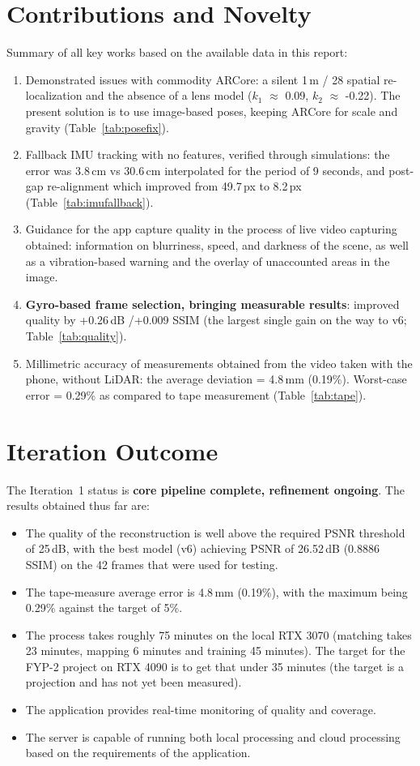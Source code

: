 \section{Contributions and Novelty}
\label{sec:novelty}
Summary of all key works based on the available data in this report:
\begin{enumerate}
    \item Demonstrated issues with commodity ARCore: a silent 1\,m / 28\textdegree{} spatial re-localization and the absence of a lens model ($k_1$ $\approx$ 0.09, $k_2$ $\approx$ -0.22). The present solution is to use image-based poses, keeping ARCore for scale and gravity (Table~\ref{tab:posefix}).
    \item Fallback IMU tracking with no features, verified through simulations: the error was 3.8\,cm vs 30.6\,cm interpolated for the period of 9 seconds, and post-gap re-alignment which improved from 49.7\,px to 8.2\,px (Table~\ref{tab:imufallback}).
    \item Guidance for the app capture quality in the process of live video capturing obtained: information on blurriness, speed, and darkness of the scene, as well as a vibration-based warning and the overlay of unaccounted areas in the image.
    \item \textbf{Gyro-based frame selection, bringing measurable results}: improved quality by +0.26\,dB /+0.009 SSIM (the largest single gain on the way to v6; Table~\ref{tab:quality}).
    \item Millimetric accuracy of measurements obtained from the video taken with the phone, without LiDAR: the average deviation = 4.8\,mm (0.19\%). Worst-case error = 0.29\% as compared to tape measurement (Table~\ref{tab:tape}).
\end{enumerate}

\section{Iteration Outcome}
The Iteration~1 status is \textbf{core pipeline complete, refinement ongoing}. The results obtained thus far are:
\begin{itemize}
    \item The quality of the reconstruction is well above the required PSNR threshold of 25\,dB, with the best model (v6) achieving PSNR of 26.52\,dB (0.8886 SSIM) on the 42 frames that were used for testing.
    \item The tape-measure average error is 4.8\,mm (0.19\%), with the maximum being 0.29\% against the target of 5\%.
    \item The process takes roughly 75 minutes on the local RTX 3070 (matching takes 23 minutes, mapping 6 minutes and training 45 minutes). The target for the FYP-2 project on RTX 4090 is to get that under 35 minutes (the target is a projection and has not yet been measured).
    \item The application provides real-time monitoring of quality and coverage.
    \item The server is capable of running both local processing and cloud processing based on the requirements of the application.
\end{itemize}

